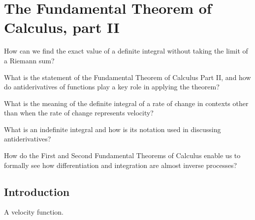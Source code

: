 \section{The Fundamental Theorem of Calculus, part II} \label{S:4.4.FTC}

\begin{goals}
\item How can we find the exact value of a definite integral without taking the limit of a Riemann sum?
\item What is the statement of the Fundamental Theorem of Calculus Part II, and how do antiderivatives of functions play a key role in applying the theorem?
\item What is the meaning of the definite integral of a rate of change in contexts other than when the rate of change represents velocity?
\item What is an indefinite integral and how is its notation used in discussing antiderivatives?
\item How do the First and Second Fundamental Theorems of Calculus enable us to formally see how differentiation and integration are almost inverse processes?
\end{goals}

\subsection*{Introduction}

\begin{marginfigure}[5in] %
\caption{A velocity function.} \label{fig:4-5_VelF}
\end{marginfigure}

